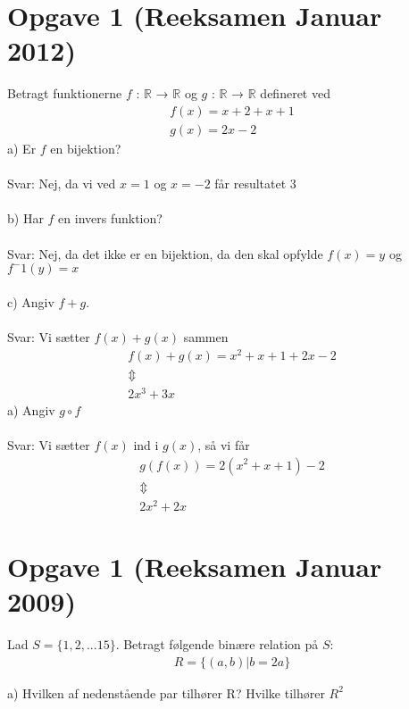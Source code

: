 \documentclass{article}
\begin{document}
\section{Opgave 1 (Reeksamen Januar 2012)}
Betragt funktionerne $f$ : $\mathbb{R}$ → $\mathbb{R}$ og $g$ : $\mathbb{R}$ → $\mathbb{R}$ defineret ved
\\
\begin{align*}
f(x) = x +2 + x + 1
\\
g(x) = 2x - 2
\end{align*}
a) Er $f$ en bijektion?
\\
\\
Svar: Nej, da vi ved $x = 1$ og $x = -2$ får resultatet $3$
\\
\\
\newline
b) Har $f$ en invers funktion?
\\
\\
Svar: Nej, da det ikke er en bijektion, da den skal opfylde $f(x) = y$ og $f^-1(y) = x$
\\
\\
c) Angiv $f + g$.
\\
\\
Svar: Vi sætter  $f(x) + g(x)$ sammen
\\
\begin{align*}
f(x) + g(x) = x^2 + x +1 + 2x - 2
\\
\Updownarrow
\\
2x^3 + 3x
\end{align*}
a) Angiv $g \circ f$
\\
\\
Svar:
Vi sætter $f(x)$ ind i $g(x)$, så vi får
\begin{align*}
g(f(x)) = 2(x^2 + x + 1)-2
\\
\Updownarrow
\\
2x^2 + 2x
\end{align*}

\section{Opgave 1 (Reeksamen Januar 2009)}
Lad $S = \{1,2,... 15 \}$. Betragt følgende binære relation på $S$:
\\
\begin{align*}
 R = \{(a,b) | b = 2a\} 
\end{align*}

a) Hvilken af nedenstående par tilhører R? Hvilke tilhører $R^2$
\end{document}
